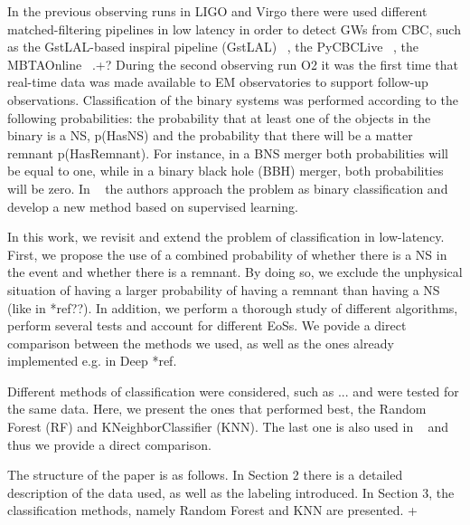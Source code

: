  
In the previous observing runs in LIGO and Virgo there were used different matched-filtering pipelines in low latency in order to detect GWs from CBC, such as the GstLAL-based inspiral pipeline (GstLAL) ~\cite{Sachdev:2020lfd}, the PyCBCLive ~\cite{Nitz_2018}, the MBTAOnline ~\cite{Adams_2016}.+? During the second observing run O2 it was the first time that real-time data was made available to EM observatories to support follow-up observations. Classification of the binary systems was performed according to the following probabilities: the probability that at least one of the objects in the binary is a NS, p(HasNS) and the probability that there will be a matter remnant p(HasRemnant). For instance, in a BNS merger both probabilities will be equal to one, while in a binary black hole (BBH) merger, both probabilities will be zero. In ~\cite{Chatterjee:2019avs} the authors approach the problem as binary classification and develop a new method based on supervised learning. 


In this work, we revisit and extend the problem of classification in low-latency. First, we propose the use of a combined probability of whether there is a NS in the event and whether there is a remnant. By doing so, we exclude the unphysical situation of having a larger probability of having a remnant than having a NS (like in *ref??). In addition, we perform a thorough study of different algorithms, perform several tests and account for different EoSs. We povide a direct comparison between the methods we used, as well as the ones already implemented e.g. in Deep *ref. 

Different methods of classification were considered, such as ... and were tested for the same data. Here, we present the ones that performed best, the Random Forest (RF) and KNeighborClassifier (KNN). The last one is also used in ~\cite{Chatterjee:2019avs} and thus we provide a direct comparison. 

The structure of the paper is as follows. In Section 2 there is a detailed description of the data used, as well as the labeling introduced. In Section 3, the classification methods, namely Random Forest and KNN are presented. +   
